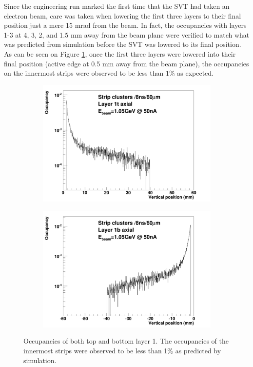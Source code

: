 Since the engineering run marked the first time that the SVT had taken an 
electron beam, care was taken when lowering the first three layers to their 
final position just a mere 15 mrad from the beam.  In fact, the occupancies 
with layers 1-3 at 4, 3, 2, and 1.5 mm away from the beam plane were verified to
match what was predicted from simulation before the SVT was lowered to its final
position.  As can be seen on Figure \ref{fig:occupancies}, once the first
three layers were lowered into their final position (active edge at 0.5 mm away from the
beam plane), the occupancies on the innermost strips were observed to be less
than 1\% as expected.
\begin{figure}[h!b]
    \begin{subfigure}{.5\textwidth}
        \centering
        \includegraphics[width=\textwidth]{images/cluster_occupancy_L1t_axial.png}
    \end{subfigure}
    \begin{subfigure}{.5\textwidth}
        \centering
        \includegraphics[width=\textwidth]{images/cluster_occupancy_L1b_axial.png}
    \end{subfigure}
    \caption{Occupancies of both top and bottom layer 1.  The occupancies of 
             the innermost strips were observed to be less than 1\% as predicted
             by simulation.}
    \label{fig:occupancies}
\end{figure}  

